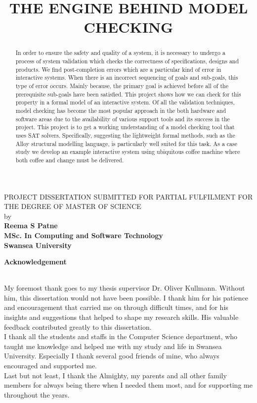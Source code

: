 \documentclass[a4paper,12pt]{extarticle}
\begin{document}
\title{THE ENGINE BEHIND MODEL CHECKING}
\maketitle
\begin{center}
\textsf{
PROJECT DISSERTATION SUBMITTED FOR PARTIAL FULFILMENT FOR THE DEGREE OF MASTER OF SCIENCE \\ by \\
}
\textbf{Reema S Patne \\ MSc. In Computing and Software Technology \\ Swansea University}
\end{center}
\newpage
\begin{abstract}
\textsf{In order to ensure the safety and quality of a system, it is necessary to undergo a process of system validation which checks the correctness of specifications, designs and products.\cite{Berardetall2001} We find post-completion errors which are a particular kind of error in interactive systems. When there is an incorrect sequencing of goals and sub-goals, this type of error occurs. Mainly because, the primary goal is achieved before all of the prerequisite sub-goals have been satisfied. This project shows how we can check for this property in a formal model of an interactive system. Of all the validation techniques, model checking has become the most popular approach in the both hardware and software areas due to the availability of various support tools and its success in the project. This project is to get a working understanding of a model checking tool that uses SAT solvers. Specifically, suggesting the lightweight formal methods, such as the Alloy structural modelling language, is particularly well suited for this task. As a case study we develop an example interactive system using ubiquitous coffee machine where both coffee and change must be delivered.}
\end{abstract}
\newpage
\begin{center}
\textbf{Acknowledgement\\}
\end{center}
\textsf{ \\ My foremost thank goes to my thesis supervisor Dr. Oliver Kullmann. Without him, this dissertation would not have been possible. I thank him for his patience and encouragement that carried me on through difficult times, and for his insights and suggestions that helped to shape my research skills. His valuable feedback contributed greatly to this dissertation.\\ I thank all the students and staffs in the Computer Science department, who taught me knowledge and helped me with my study and life in Swansea University. Especially I thank several good friends of mine, who always encouraged and supported me.\\ Last but not least, I thank the Almighty, my parents and all other family members for always being there when I needed them most, and for supporting me throughout the years.}
\end{document}
